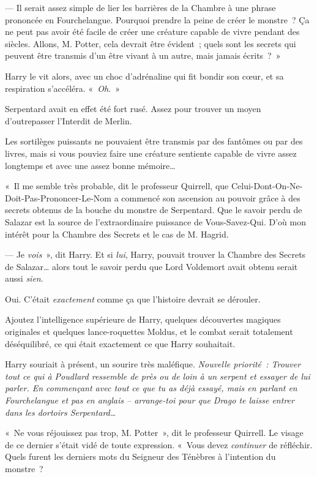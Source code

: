 --- Il serait assez simple de lier les barrières de la Chambre à une phrase prononcée en Fourchelangue.
Pourquoi prendre la peine de créer le monstre~?
Ça ne peut pas avoir été facile de créer une créature capable de vivre pendant des siècles.
Allons, M. Potter, cela devrait être évident~; quels sont les secrets qui peuvent être transmis d'un être vivant à un autre, mais jamais écrits~?~»

Harry le vit alors, avec un choc d'adrénaline qui fit bondir son cœur, et sa respiration s'accéléra.
«~\emph{Oh.}~»

Serpentard avait en effet été fort rusé.
Assez pour trouver un moyen d'outrepasser l'Interdit de Merlin.

Les sortilèges puissants ne pouvaient être transmis par des fantômes ou par des livres, mais si vous pouviez faire une créature sentiente capable de vivre assez longtemps et avec une assez bonne mémoire…

«~Il me semble très probable, dit le professeur Quirrell, que Celui-Dont-On-Ne-Doit-Pas-Prononcer-Le-Nom a commencé son ascension au pouvoir grâce à des secrets obtenus de la bouche du monstre de Serpentard.
Que le savoir perdu de Salazar est la source de l'extraordinaire puissance de Vous-Savez-Qui.
D'où mon intérêt pour la Chambre des Secrets et le cas de M. Hagrid.

--- Je \emph{vois}~», dit Harry.
Et si \emph{lui}, Harry, pouvait trouver la Chambre des Secrets de Salazar… alors tout le savoir perdu que Lord Voldemort avait obtenu serait aussi \emph{sien}.

Oui. C'était \emph{exactement} comme ça que l'histoire devrait se dérouler.

Ajoutez l'intelligence supérieure de Harry, quelques découvertes magiques originales et quelques lance-roquettes Moldus, et le combat serait totalement déséquilibré, ce qui était exactement ce que Harry souhaitait.

Harry souriait à présent, un sourire très maléfique.
\emph{Nouvelle priorité~: Trouver tout ce qui à Poudlard ressemble de près ou de loin à un serpent et essayer de lui parler.
En commençant avec tout ce que tu as déjà essayé, mais en parlant en Fourchelangue et pas en anglais -- arrange-toi pour que Drago te laisse entrer dans les dortoirs Serpentard…}

«~Ne vous réjouissez pas trop, M. Potter~», dit le professeur Quirrell.
Le visage de ce dernier s'était vidé de toute expression.
«~Vous devez \emph{continuer} de réfléchir.
Quels furent les derniers mots du Seigneur des Ténèbres à l'intention du monstre~?

